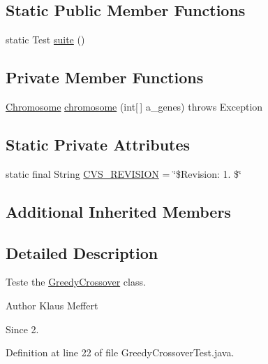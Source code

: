 \subsection*{Static Public Member Functions}
\begin{DoxyCompactItemize}
\item 
static Test \hyperlink{classorg_1_1jgap_1_1impl_1_1_greedy_crossover_test_a80f772affd7252831b44ea6b3d99b2ea}{suite} ()
\end{DoxyCompactItemize}
\subsection*{Private Member Functions}
\begin{DoxyCompactItemize}
\item 
\hyperlink{classorg_1_1jgap_1_1_chromosome}{Chromosome} \hyperlink{classorg_1_1jgap_1_1impl_1_1_greedy_crossover_test_a9ba2cfa24659dd4f63ca417c7af4107d}{chromosome} (int\mbox{[}$\,$\mbox{]} a\-\_\-genes)  throws Exception 
\end{DoxyCompactItemize}
\subsection*{Static Private Attributes}
\begin{DoxyCompactItemize}
\item 
static final String \hyperlink{classorg_1_1jgap_1_1impl_1_1_greedy_crossover_test_ac533e58c4cc8873ee3d40f2d56f9435f}{C\-V\-S\-\_\-\-R\-E\-V\-I\-S\-I\-O\-N} = \char`\"{}\$Revision\-: 1. \$\char`\"{}
\end{DoxyCompactItemize}
\subsection*{Additional Inherited Members}


\subsection{Detailed Description}
Teste the \hyperlink{classorg_1_1jgap_1_1impl_1_1_greedy_crossover}{Greedy\-Crossover} class.

\begin{DoxyAuthor}{Author}
Klaus Meffert 
\end{DoxyAuthor}
\begin{DoxySince}{Since}
2. 
\end{DoxySince}


Definition at line 22 of file Greedy\-Crossover\-Test.\-java.



